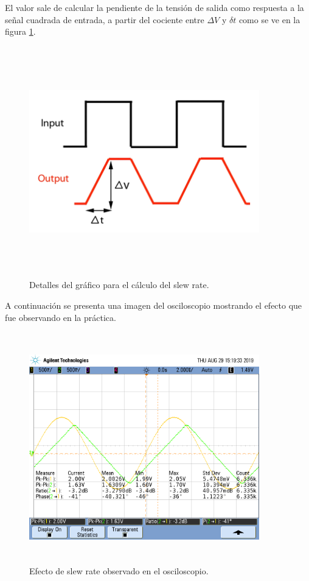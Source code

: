 	El valor sale de calcular la pendiente de la tensi\'on de salida como respuesta a la se\~nal cuadrada de entrada, a partir del cociente entre $\Delta V$ y $\delta t$ como se ve en la figura \ref{srt}.

	\begin{figure}[H] %
		\centering
		\includegraphics[width=10cm,height=10cm,keepaspectratio]{../EJ1/00GRAFICOS/srt.png}
		\caption{Detalles del gr\'afico para el c\'alculo del slew rate.}
		\label{srt}
	\end{figure}

	A continuaci\'on se presenta una imagen del osciloscopio mostrando el efecto que fue observando en la pr\'actica.

	\begin{figure}[H] %
		\centering
		\includegraphics[width=10cm,height=10cm,keepaspectratio]{../EJ1/00GRAFICOS/srm.png}
		\caption{Efecto de slew rate observado en el osciloscopio.}
		\label{srm}
	\end{figure}

